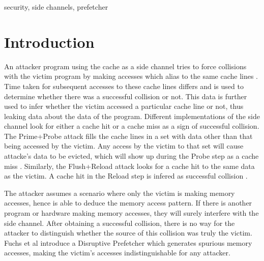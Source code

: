 \documentclass[conference]{IEEEtran}
\begin{document}
\begin{IEEEkeywords}
security, side channels, prefetcher
\end{IEEEkeywords}

\section{Introduction}

An attacker program using the cache as a side channel tries to force
collisions with the victim program by making accesses which alias to the
same cache lines \cite{osvik-cache-attacks}.
Time taken for subsequent accesses to these cache lines differs and is used to
determine whether there was a successful collision or not.
This data is further used to infer whether the victim accessed a particular
cache line or not, thus leaking data about the data of the program.
Different implementations of the side channel look for either a cache
hit or a cache miss as a sign of successful collision.
The Prime+Probe attack fills the cache lines in a set with data other than
that being accessed by the victim. Any access by the victim to that set will
cause attacke's data to be evicted, which will show up during the Probe step
as a cache miss \cite{osvik-cache-attacks}.
Similarly, the Flush+Reload attack looks for a cache hit to the same
data as the victim. A cache hit in the Reload step is infered as successful
collision \cite{percival-rsa}.

The attacker assumes a scenario where only the victim is making memory
accesses, hence is able to deduce the memory access pattern. If there is
another program or hardware making memory accesses, they will surely
interfere with the side channel. After obtaining a successful collision,
there is no way for the attacker to distinguish whether the source of
this collision was truly the victim. Fuchs et al \cite{fuchs-disruptive}
introduce a Disruptive Prefetcher which generates spurious memory accesses,
making the victim's accesses indistinguishable for any attacker.
\end{document}
